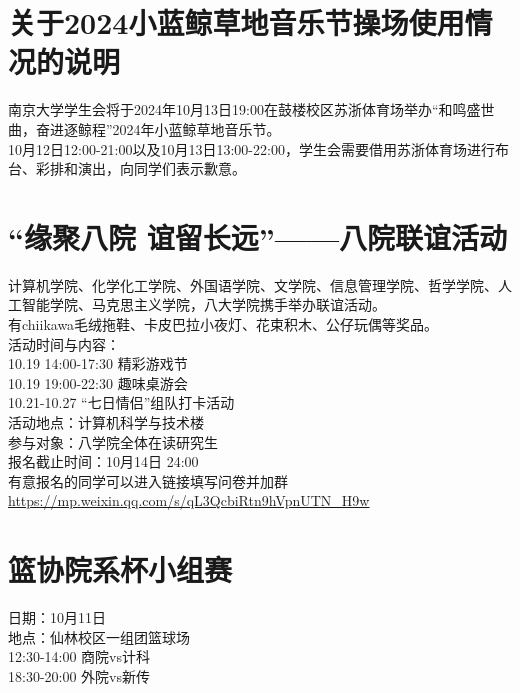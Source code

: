 \documentclass[letterpaper, 12pt]{article}
\begin{document}
\begin{multicols}{2}
\section{关于2024小蓝鲸草地音乐节操场使用情况的说明}
南京大学学生会将于2024年10月13日19:00在鼓楼校区苏浙体育场举办“和鸣盛世曲，奋进逐鲸程”2024年小蓝鲸草地音乐节。\\%
10月12日12:00-21:00以及10月13日13:00-22:00，学生会需要借用苏浙体育场进行布台、彩排和演出，向同学们表示歉意。\\
\section{“缘聚八院 谊留长远”——八院联谊活动}
计算机学院、化学化工学院、外国语学院、文学院、信息管理学院、哲学学院、人工智能学院、马克思主义学院，八大学院携手举办联谊活动。\\
有chiikawa毛绒拖鞋、卡皮巴拉小夜灯、花束积木、公仔玩偶等奖品。\\
活动时间与内容：\\
10.19 14:00-17:30 精彩游戏节\\
10.19 19:00-22:30 趣味桌游会\\
10.21-10.27 “七日情侣”组队打卡活动\\
活动地点：计算机科学与技术楼\\
参与对象：八学院全体在读研究生\\
报名截止时间：10月14日 24:00\\
有意报名的同学可以进入链接填写问卷并加群\url{https://mp.weixin.qq.com/s/qL3QcbiRtn9hVpnUTN_H9w}
\section{篮协院系杯小组赛}
日期：10月11日\\
地点：仙林校区一组团篮球场\\
12:30-14:00 商院vs计科\\
18:30-20:00 外院vs新传

\end{multicols}
\end{document}
